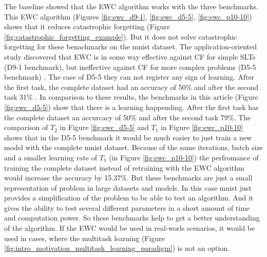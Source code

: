 The baseline showed that the EWC algorithm works with the three benchmarks.
This EWC algorithm (Figures \ref{fig:ewc_d9-1}, \ref{fig:ewc_d5-5}, \ref{fig:ewc_p10-10}) shows that it reduces catastrophic forgetting (Figure \ref{fig:catastrophic_forgetting_example}).
But it does not solve catastrophic forgetting for these benachmarks on the mnist dataset.
The application-oriented study \cite{cf_application_oriented_study} discovered that EWC is in some way effective against CF for simple SLTs (D9-1 benchmark), but ineffective against CF for more complex problems (D5-5 benchmark) \cite{cf_application_oriented_study}.
The case of D5-5 they can not register any sign of learning.
After the first task, the complete dataset had an accuracy of 50\% and after the second task 31\% 
\cite{cf_application_oriented_study}.
In comparison to these results, the benchmarks in this article (Figure \ref{fig:ewc_d5-5}) show that there is a learning happending.
After the first task has the complete dataset an accurcacy of 50\% and after the second task 79\%.
\newline
The comparison of $T_2$ in Figure \ref{fig:ewc_d5-5} and $T_1$ in Figure \ref{fig:ewc_p10-10} shows that in the D5-5 benchmark it would be much easier to just train a new model with the complete mnist dataset.
Because of the same iterations, batch size and a smaller learning rate of $T_1$ (in Figure \ref{fig:ewc_p10-10}) the perfromance of training the complete dataset instead of retraining with the EWC algorithm would increase the accuracy by 15.37\%.
But these benchmarks are just a small representation of problem in large datasets and models.
In this case mnist just provides a simplification of the problem to be able to test an algorithm.
And it gives the ability to test several different parameters in a short amount of time and computation power.
So these benchmarks help to get a better understanding of the algorithm.
If the EWC would be used in real-worls scenarios, it would be used in cases, where the multitask learning (Figure \ref{fig:intro_motivation_multitask_learning_paradigm}) is not an option.

